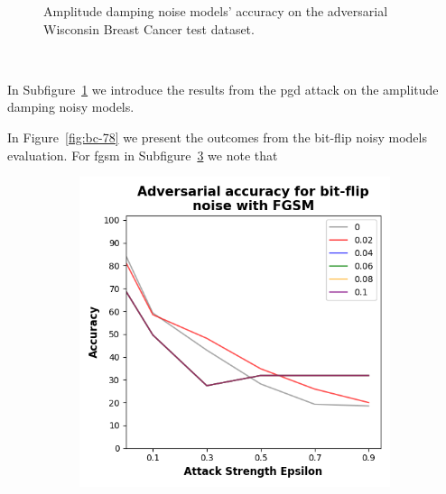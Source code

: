 \begin{figure}[!h]
\begin{subfigure}{0.45\textwidth}
      \label{fig:bc6}
  \end{subfigure}
  \caption{Amplitude damping noise models' accuracy on the adversarial Wisconsin Breast Cancer test dataset.}
  \label{fig:bc-56}
\end{figure} \

In Subfigure~\ref{fig:bc6} we introduce the results from the \ac{pgd}
attack on the amplitude damping noisy models. \

In Figure~\ref{fig:bc-78} we present the outcomes from the bit-flip
noisy models evaluation. For \ac{fgsm} in Subfigure~\ref{fig:bc7}
we note that \

\begin{figure}[!h]
  \centering

  \begin{subfigure}{0.45\textwidth}
      \includegraphics[width=\linewidth]{figures/evaluation_results/breast-cancer/pqc/figures/bit-flip-fgsm.png}
      \label{fig:bc7}
  \end{subfigure} \qquad
  \begin{subfigure}{0.45\textwidth}

\end{subfigure}
\end{figure}
